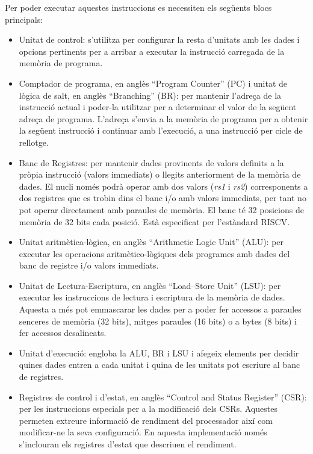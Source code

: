 \documentclass[10pt,a4paper,twocolumn,twoside]{article}
\begin{document}
    Per poder executar aquestes instruccions es necessiten els següents blocs principals:
    \begin{itemize}
        \item Unitat de control: s'utilitza per configurar la resta d'unitats amb les dades i opcions pertinents per a arribar a executar la instrucció carregada de la memòria de programa.
        \item Comptador de programa, en anglès ``Program Counter'' (PC) i unitat de lògica de salt, en anglès ``Branching'' (BR): per mantenir l'adreça de la instrucció actual i poder-la utilitzar per a determinar el valor de la següent adreça de programa. L'adreça s'envia a la memòria de programa per a obtenir la següent instrucció i continuar amb l'execució, a una instrucció per cicle de rellotge.
        \item Banc de Registres: per mantenir dades provinents de valors definits a la pròpia instrucció (valors immediats) o llegits anteriorment de la memòria de dades. El nucli només podrà operar amb dos valors (\textit{rs1} i \textit{rs2}) corresponents a dos registres que es trobin dins el banc i/o amb valors immediats, per tant no pot operar directament amb paraules de memòria. El banc té 32 posicions de memòria de 32 bits cada posició. Està especificat per l’estàndard RISCV.
        \item Unitat aritmètica-lògica, en anglès ``Arithmetic Logic Unit'' (ALU): per executar les operacions aritmètico-lògiques dels programes amb dades del banc de registre i/o valors immediats.
        \item Unitat de Lectura-Escriptura, en anglès ``Load–Store Unit'' (LSU): per executar les instruccions de lectura i escriptura de la memòria de dades. Aquesta a més pot emmascarar les dades per a poder fer accessos a paraules senceres de memòria (32 bits), mitges paraules (16 bits) o a bytes (8 bits) i fer accessos desalineats.
        \item Unitat d'execució: engloba la ALU, BR i LSU i afegeix elements per decidir quines dades entren a cada unitat i quina de les unitats pot escriure  al banc de registres.
        \item Registres de control i d’estat, en anglès ``Control and Status Register'' (CSR): per les instruccions especials per a la modificació dels CSRs. Aquestes permeten extreure informació de rendiment del processador així com modificar-ne la seva configuració. En aquesta implementació només s'inclouran els registres d'estat que descriuen el rendiment.
    \end{itemize}
    
\end{document}
